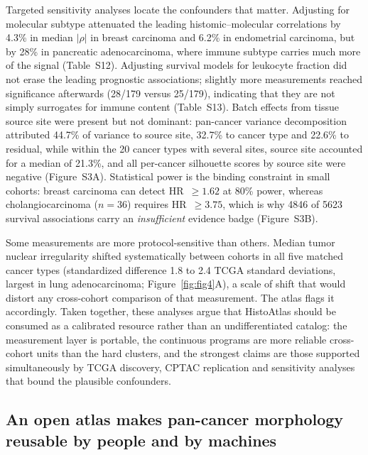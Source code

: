 Targeted sensitivity analyses locate the confounders that matter. Adjusting for
molecular subtype attenuated the leading histomic--molecular correlations by
4.3\% in median $|\rho|$ in breast carcinoma and 6.2\% in endometrial carcinoma,
but by 28\% in pancreatic adenocarcinoma, where immune subtype carries much more
of the signal (Table~S12). Adjusting survival models for leukocyte fraction did
not erase the leading prognostic associations; slightly more measurements reached
significance afterwards (28/179 versus 25/179), indicating that they are not
simply surrogates for immune content (Table~S13). Batch effects from tissue
source site were present but not dominant: pan-cancer variance decomposition
attributed 44.7\% of variance to source site, 32.7\% to cancer type and 22.6\% to
residual, while within the 20 cancer types with several sites, source site
accounted for a median of 21.3\%, and all per-cancer silhouette scores by source
site were negative (Figure~S3A). Statistical power is the binding constraint in
small cohorts: breast carcinoma can detect HR~$\geq 1.62$ at 80\% power, whereas
cholangiocarcinoma ($n = 36$) requires HR~$\geq 3.75$, which is why \num{4846} of
\num{5623} survival associations carry an \emph{insufficient} evidence badge
(Figure~S3B).

Some measurements are more protocol-sensitive than others. Median tumor nuclear
irregularity shifted systematically between cohorts in all five matched cancer
types (standardized difference 1.8 to 2.4 TCGA standard deviations, largest in
lung adenocarcinoma; Figure~\ref{fig:fig4}A), a scale of shift that would
distort any cross-cohort comparison of that measurement. The atlas flags it
accordingly. Taken together, these analyses argue that HistoAtlas should be
consumed as a calibrated resource rather than an undifferentiated catalog: the
measurement layer is portable, the continuous programs are more reliable
cross-cohort units than the hard clusters, and the strongest claims are those
supported simultaneously by TCGA discovery, CPTAC replication and sensitivity
analyses that bound the plausible confounders.

\subsection{An open atlas makes pan-cancer morphology reusable by people and by machines}
\label{sec:results:atlas}

